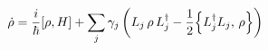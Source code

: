 $$
    \dot{\rho} = \frac{i}{\hbar} [\rho,H] + \sum_j \gamma_j \left( L_j \, \rho \,  L_j^\dagger - \frac{1}{2} \Bigl\{ L_j^\dagger L_j, \, \rho \Bigr\} \right)
    \label{eq:Lindblad}
$$